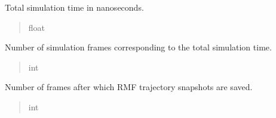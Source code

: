 \documentclass[letterpaper,10pt,english]{sphinxmanual}
\begin{document}
\begin{fulllineitems}
\begin{fulllineitems}
\begin{quote}
\begin{description}
\end{description}\end{quote}

\end{fulllineitems}


\begin{fulllineitems}
\label{\detokenize{src:src.Simulation_Class.Simulation.sim_time_ns}}
\pysigstartsignatures
{}
\pysigstopsignatures
\sphinxAtStartPar
Total simulation time in nanoseconds.
\begin{quote}\begin{description}
\sphinxAtStartPar
float

\end{description}\end{quote}

\end{fulllineitems}


\begin{fulllineitems}
\label{\detokenize{src:src.Simulation_Class.Simulation.sim_time_frames}}
\pysigstartsignatures
{}
\pysigstopsignatures
\sphinxAtStartPar
Number of simulation frames corresponding to the total simulation time.
\begin{quote}\begin{description}
\sphinxAtStartPar
int

\end{description}\end{quote}

\end{fulllineitems}


\begin{fulllineitems}
\label{\detokenize{src:src.Simulation_Class.Simulation.rmf_dump_interval_frames}}
\pysigstartsignatures
{}
\pysigstopsignatures
\sphinxAtStartPar
Number of frames after which RMF trajectory snapshots are saved.
\begin{quote}\begin{description}
\sphinxAtStartPar
int


\end{description}
\end{quote}
\end{fulllineitems}
\end{fulllineitems}
\end{document}
